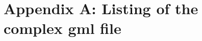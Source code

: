 \section*{Appendix A: Listing of the complex gml file}
\label{sec:appendix_A}

\begin{center}
	
\end{center}
